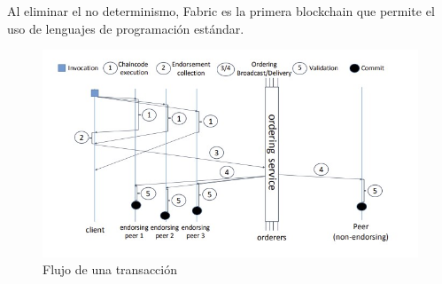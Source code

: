 Al eliminar el no determinismo, Fabric es la primera blockchain que permite el uso de lenguajes de programación estándar. 


%
%
%
%

\begin{figure}[tbph]
\centering
\includegraphics[width=\textwidth]{Images/transaction_flow}
\caption{Flujo de una transacción}
\label{fig:transactionflow}
\end{figure}




